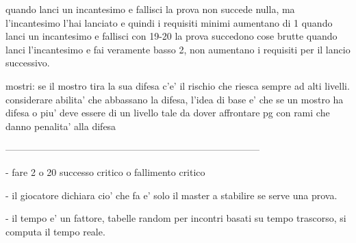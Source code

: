 \documentclass[12pt,a4paper,twoside,openany,twocolumn]{book}
\begin{document}
quando lanci un incantesimo e fallisci la prova non succede nulla, ma l'incantesimo l'hai lanciato e quindi i requisiti minimi aumentano di 1
quando lanci un incantesimo e fallisci con 19-20 la prova succedono cose  brutte
quando lanci l'incantesimo e fai veramente basso 2, non aumentano i requisiti per il lancio successivo.


mostri:
se il mostro tira la sua difesa c'e' il rischio che riesca sempre ad alti livelli. considerare abilita' che abbassano la difesa, l'idea di base e' che se un mostro ha difesa  o piu' deve essere di un livello tale da dover affrontare pg con rami che danno penalita' alla difesa


--------------------------------------------------------------------------------



- fare 2 o 20  successo critico o fallimento  critico

- il giocatore dichiara cio' che fa e' solo il master a stabilire se serve una prova. 

- il tempo e' un fattore, tabelle random per incontri basati su tempo trascorso, si computa il tempo reale.
\end{document}
